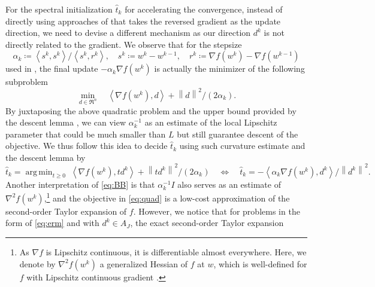 \documentclass{article}
\theoremstyle{plain}
\theoremstyle{definition}
\theoremstyle{remark}
\newcommand\inner[2]{\left\langle #1, #2 \right\rangle}
\DeclareMathOperator*{\argmin}{arg\,min}
\newcommand{\norm}[1]{{\left\|{#1}\right\|}}
\begin{document}
For the spectral initialization $\hat t_k$ for accelerating the
convergence,
instead of directly using approaches of \cite{JB88a,WriNF09a} that takes
the reversed gradient as the update direction,
we need to devise a different mechanism as
our direction $d^k$ is not directly related to the gradient.
We observe that for the stepsize
\begin{equation}
	\label{eq:BB}
	\alpha_k \coloneqq \inner{s^k}{s^k}/\inner{s^k}{r^k}, \quad
	s^k \coloneqq w^{k} - w^{k-1}, \quad r^k \coloneqq \nabla f(w^k) -
	\nabla f(w^{k-1})
\end{equation}
used in \cite{JB88a}, the final update $-\alpha_k\nabla f(w^k)$ is actually
the minimizer of the following subproblem
\begin{equation}
	\label{eq:quad}
	\min_{d\in\Re^n}\quad \inner{\nabla f(w^k)}{d} +  \norm{d}^2/ (2
	\alpha_k).
\end{equation}
By juxtaposing the above quadratic problem and the upper bound provided by 
the descent lemma \cite[Lemma 5.7]{Beck17},
we can view $\alpha_k^{-1}$ as an estimate of the local Lipschitz
parameter that could be much smaller than $L$ but still guarantee
descent of the objective.
We thus follow this idea to decide $\hat t_k$ using such curvature
estimate and the descent lemma by
\begin{equation}
	\label{eq:BB_extrapolation}
	\hat t_k = \argmin_{t\geq 0}\; \inner{\nabla f(w^k)}{t d^k} +
	\norm{t d^k}^2 / (2\alpha_k)\quad \Leftrightarrow \quad
	\hat t_k = -\inner{\alpha_k \nabla f(w^k)}{
	d^k}/ \norm{d^k}^2.
\end{equation}
Another interpretation of \cref{eq:BB} is that $\alpha_k^{-1} I$
also serves as an estimate of $\nabla^2 f(w^k)$,\footnote{As $\nabla f$ is Lipschitz
continuous, it is differentiable almost everywhere.
Here, we denote by $\nabla ^2 f(w^k)$ a generalized Hessian of $f$
at $w$, which is well-defined for $f$ with Lipschitz continuous
gradient \citep{HUJ84a}.}
and the objective in \cref{eq:quad} is a low-cost approximation of the
second-order Taylor expansion of $f$.
However, we notice that for problems in the form of \cref{eq:erm} and
with $d^k \in A_J$, the exact second-order Taylor expansion
\end{document}
